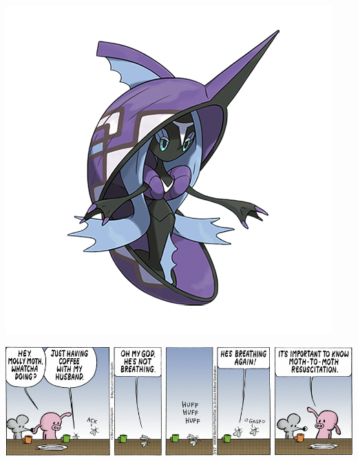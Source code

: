 \documentclass[landscape]{article}
\begin{document}
\begin{multicols}{3}
\vspace{-0.4cm}

\noindent\begin{minipage}{0.3\linewidth}
\noindent\includegraphics[width=\linewidth]{images/pokedex.png}
\end{minipage}
\begin{minipage}{0.74\linewidth}

\end{minipage}

\center\includegraphics[width=\linewidth]{images/comic-pearls.png}

\setnormallinewidth{0.3pt}
\setthicklinewidth{1pt}
\begin{center}
\begin{starbattle}
\framepuzzle

\end{starbattle}
\end{center}

\renewcommand*\sudokuformat[1]{\sffamily#1}
\setlength{}
\setlength\sudokuthickline{1pt}
\begin{center}
	
\end{center}

% 	

\end{multicols}
\end{document}
